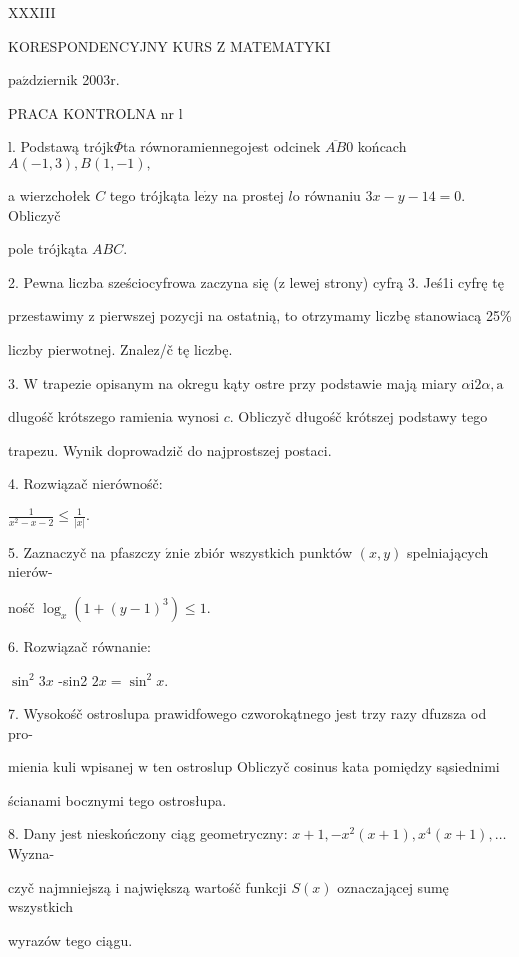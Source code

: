 \documentclass[a4paper,12pt]{article}
\begin{document}
XXXIII

KORESPONDENCYJNY KURS Z MATEMATYKI

$\mathrm{p}\mathrm{a}\acute{\mathrm{z}}$dziernik 2$003\mathrm{r}.$

PRACA KONTROLNA nr l

l. Podstawą trójk$\Phi$ta równoramiennegojest odcinek $\overline{AB}0$ końcach $A(-1,3), B(1,-1),$

a wierzchołek $C$ tego trójkąta $\mathrm{l}\mathrm{e}\dot{\mathrm{z}}\mathrm{y}$ na prostej $l\mathrm{o}$ równaniu $3x-y-14=0$. Obliczyč

pole trójkąta $ABC.$

2. Pewna liczba sześciocyfrowa zaczyna się ($\mathrm{z}$ lewej strony) cyfrą 3. Jeś1i cyfrę tę

przestawimy $\mathrm{z}$ pierwszej pozycji na ostatnią, to otrzymamy liczbę stanowiacą 25\%

liczby pierwotnej. Znalez/č tę liczbę.

3. $\mathrm{W}$ trapezie opisanym na okregu kąty ostre przy podstawie mają miary $\alpha \mathrm{i}2\alpha, \mathrm{a}$

dlugośč krótszego ramienia wynosi $c$. Obliczyč długośč krótszej podstawy tego

trapezu. Wynik doprowadzič do najprostszej postaci.

4. Rozwiązač nierównośč:

$\displaystyle \frac{1}{x^{2}-x-2}\leq\frac{1}{|x|}.$

5. Zaznaczyč na pfaszczy $\acute{\mathrm{z}}\mathrm{n}\mathrm{i}\mathrm{e}$ zbiór wszystkich punktów $(x,y)$ spelniających nierów-

nośč $\log_{x}(1+(y-1)^{3})\leq 1.$

6. Rozwiązač równanie:

$\sin^{2}3x$ -sin2 $2x=\sin^{2}x.$

7. Wysokośč ostroslupa prawidfowego czworokątnego jest trzy razy dfuzsza od pro-

mienia kuli wpisanej $\mathrm{w}$ ten ostroslup Obliczyč cosinus kata pomiędzy sąsiednimi

ścianami bocznymi tego ostrosłupa.

8. Dany jest nieskończony ciąg geometryczny: $x+1, -x^{2}(x+1), x^{4}(x+1), \ldots$ Wyzna-

czyč najmniejszą $\mathrm{i}$ największą wartośč funkcji $S(x)$ oznaczającej sumę wszystkich

wyrazów tego ciągu.
\end{document}
